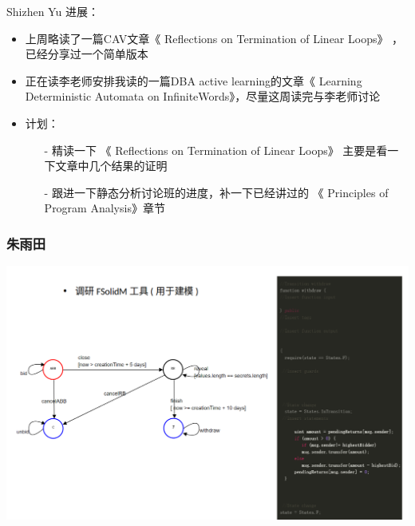 \documentclass[aspectratio=1610, 13pt]{beamer}
\begin{document}
\begin{frame}{Shizhen Yu}
进展：
    \begin{itemize}
        \item 上周略读了一篇CAV文章《 Reflections on Termination of Linear
        Loops》 ，已经分享过一个简单版本
        \item 正在读李老师安排我读的一篇DBA active learning的文章《 Learning Deterministic Automata on InfiniteWords》，尽量这周读完与李老师讨论
        
        \item 计划：
        \begin{itemize}
            \item [-] 精读一下 《 Reflections on Termination of Linear        Loops》 主要是看一下文章中几个结果的证明
            \item [-] 跟进一下静态分析讨论班的进度，补一下已经讲过的 《 Principles of Program Analysis》章节
            
        \end{itemize}
\end{itemize}    
\end{frame}

\begin{frame}\frametitle{朱雨田}
\begin{center}
\includegraphics[scale=0.3]{zyt1.png}
\end{center}
\end{frame}
\end{document}

